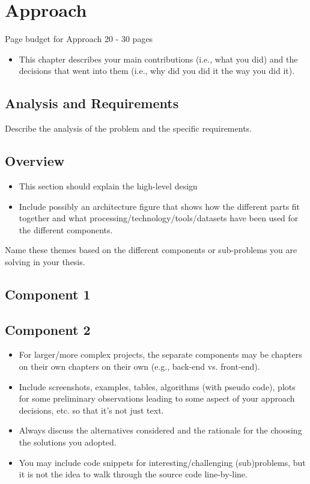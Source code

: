\chapter{Approach}
\label{ch:approach}
Page budget for Approach 20 - 30 pages
\begin{itemize}
    \item This chapter describes your main contributions (i.e., what you did) and the decisions that went into them (i.e., why did you did it the way you did it).
    
\end{itemize}
\section{Analysis and Requirements}
Describe the analysis of the problem and the specific requirements.

\section{Overview}
\begin{itemize}
    \item This section should explain the high-level design
    \item Include possibly an architecture figure that shows how the different parts fit together and what processing/technology/tools/datasets have been used for the different components.
\end{itemize}
    
    Name these themes based on the different components or sub-problems you are solving in your thesis.
    
    \section{Component 1}
    \section{Component 2}
    
    \begin{itemize}
    \item For larger/more complex projects, the separate components may be chapters on their own chapters on their own (e.g., back-end vs. front-end).
    \item Include screenshots, examples, tables, algorithms (with pseudo code), plots for some preliminary observations leading to some aspect of your approach decisions, etc. so that it's not just text.
    \item Always discuss the alternatives considered and the rationale for the choosing the solutions you adopted.
    \item You may include code snippets for interesting/challenging (sub)problems, but it is not the idea to walk through the source code line-by-line.
\end{itemize}
    